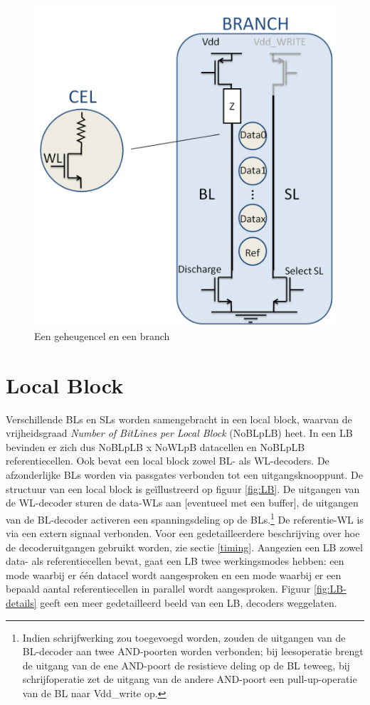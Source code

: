 \begin{figure}
  \centering
  \includegraphics[scale=0.3]{../fig/hfdstk-architecture-cell-branch.png}
  \caption{Een geheugencel en een branch}
  \label{fig:cellbranch}
\end{figure}

\section{Local Block}
Verschillende BLs en SLs worden samengebracht in een local block, waarvan de vrijheidsgraad \emph{Number of BitLines per Local Block} (NoBLpLB) heet. In een LB bevinden er zich dus NoBLpLB x NoWLpB datacellen en NoBLpLB referentiecellen. Ook bevat een local block zowel BL- als WL-decoders. De afzonderlijke BLs worden via passgates verbonden tot een uitgangsknooppunt.
De structuur van een local block is geïllustreerd op figuur \ref{fig:LB}.
De uitgangen van de WL-decoder sturen de data-WLs aan [eventueel met een buffer], de uitgangen van de BL-decoder activeren een spanningsdeling op de BLs.\footnote{Indien schrijfwerking zou toegevoegd worden, zouden de uitgangen van de BL-decoder aan twee AND-poorten worden verbonden; bij leesoperatie brengt de uitgang van de ene AND-poort de resistieve deling op de BL teweeg, bij schrijfoperatie zet de uitgang van de andere AND-poort een pull-up-operatie van de BL naar Vdd\_write op.} De referentie-WL is via een extern signaal verbonden. Voor een gedetailleerdere beschrijving over hoe de decoderuitgangen gebruikt worden, zie sectie \ref{timing}.
Aangezien een LB zowel data- als referentiecellen bevat, gaat een LB twee werkingsmodes hebben: een mode waarbij er één datacel wordt aangesproken en een mode waarbij er een bepaald aantal referentiecellen in parallel wordt aangesproken.
Figuur \ref{fig:LB-details} geeft een meer gedetailleerd beeld van een LB, decoders weggelaten.

